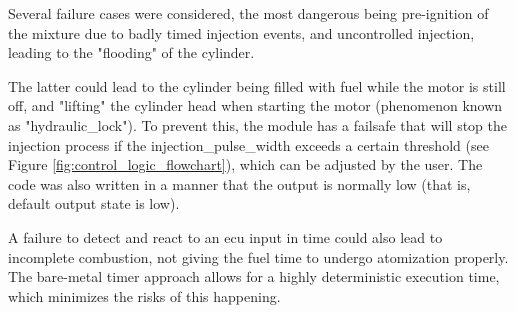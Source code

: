             Several failure cases were considered, the most dangerous being pre-ignition of the mixture due to badly timed injection events, and uncontrolled injection, leading to the "flooding" of the cylinder.

            The latter could lead to the cylinder being filled with fuel while the motor is still off, and "lifting" the cylinder head when starting the motor (phenomenon known as "\gls{hydraulic_lock}"). To prevent this, the module has a failsafe that will stop the injection process if the \gls{injection_pulse_width} exceeds a certain threshold (see Figure \ref{fig:control_logic_flowchart}), which can be adjusted by the user. The code was also written in a manner that the output is normally low (that is, default output state is low).

            A failure to detect and react to an \gls{ecu} input in time could also lead to incomplete combustion, not giving the fuel time to undergo \gls{atomization} properly. The bare-metal timer approach allows for a highly \gls{deterministic} execution time, which minimizes the risks of this happening.

